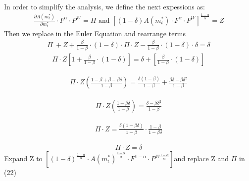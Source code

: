 \documentclass[12pt]{article}
\begin{document}
\[
\]
\normalsize
In order to simplify the analysis, we define the next expessions as:
\begin{equation}
\begin{aligned}
\frac{\partial A(m^\ast_t)}{\partial m^\ast_t}\cdot F^\alpha\cdot P^W=\Pi\text{   and   }\left[(1-\delta)A(m^\ast_t)\cdot F^\alpha \cdot P^W\right]^\frac{1-\alpha}{\alpha}=Z
\end{aligned}
\end{equation}
\[
\]
\normalsize
Then we replace in the Euler Equation and rearrange terms
\begin{equation}
\begin{aligned}
\Pi\ +Z+\frac{\beta}{1-\beta}\cdot (1-\delta)\cdot \Pi\cdot Z-\frac{\beta}{1-\beta}\cdot (1-\delta)\cdot \delta=\delta
\end{aligned}
\end{equation}
\begin{equation}
\begin{aligned}
\Pi\cdot Z \left[1+\frac{\beta}{1-\beta}\cdot (1-\delta)\right]=\delta +\left[\frac{\beta}{1-\beta}\cdot (1-\delta)\right]
\end{aligned}
\end{equation}

\begin{equation}
\begin{aligned}
\Pi\cdot Z\left(\frac{1-\beta+\beta-\beta\delta}{1-\beta}\right)=\frac{\delta(1-\beta)}{1-\beta}+\frac{\beta\delta-\beta\delta^2}{1-\beta}
\end{aligned}
\end{equation}

\begin{equation}
\begin{aligned}
\Pi\cdot Z\left(\frac{1-\beta\delta}{1-\beta}\right)=\frac{\delta-\beta\delta^2}{1-\beta}
\end{aligned}
\end{equation}

\begin{equation}
\begin{aligned}
\Pi\cdot Z=\frac{\delta(1-\beta\delta)}{1-\beta}\cdot\frac{1-\beta}{1-\beta\delta}
\end{aligned}
\end{equation}

\begin{equation}
\begin{aligned}
\Pi\cdot Z=\delta
\end{aligned}
\end{equation}
\normalsize
Expand Z to $\left[(1-\delta)^\frac{1-\alpha}{\alpha}\cdot A(m^\ast_t)^\frac{1-\alpha}{\alpha}\cdot F^{1-\alpha}\cdot P^{W\frac{1-\alpha}{\alpha}}\right]$and replace Z and $\Pi$ in (22) 
\end{document}
